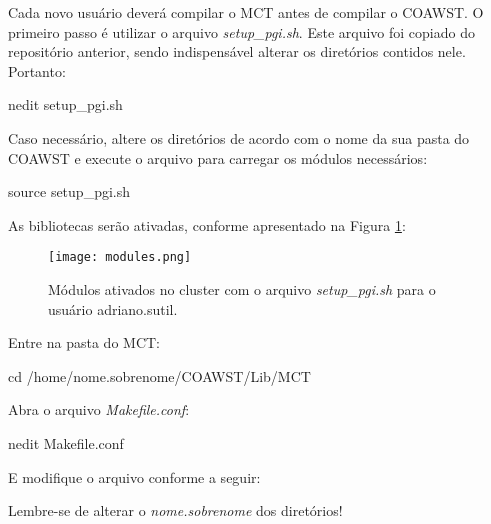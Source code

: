 \noindent Cada novo usuário deverá compilar o MCT antes de compilar o COAWST. O primeiro passo é utilizar o arquivo \textit{setup\_pgi.sh}. Este arquivo foi copiado do repositório anterior, sendo indispensável alterar os diretórios contidos nele.
Portanto:
\bigskip

\begin{bashcode}
nedit setup_pgi.sh
\end{bashcode}
\bigskip

\noindent Caso necessário, altere os diretórios de acordo com o nome da sua pasta do COAWST e execute o arquivo para carregar os módulos necessários:
\bigskip

\begin{bashcode}
source setup_pgi.sh
\end{bashcode}
\bigskip

\noindent As bibliotecas serão ativadas, conforme apresentado na Figura \textcolor{bleu_cite}{\ref{modulos}}:
\bigskip


\begin{figure}[H]
    \centering
    \texttt{[image: modules.png]}
    \caption{Módulos ativados no cluster com o arquivo \textit{setup\_pgi.sh} para o usuário adriano.sutil.}
    \label{modulos}
\end{figure}
\bigskip


\noindent Entre na pasta do MCT:
\bigskip

\begin{bashcode}
cd /home/nome.sobrenome/COAWST/Lib/MCT
\end{bashcode}
\bigskip

\noindent Abra o arquivo \textit{Makefile.conf}:
\bigskip


\begin{bashcode}
nedit Makefile.conf
\end{bashcode}
\bigskip

\noindent E modifique o arquivo conforme a seguir:
\bigskip

\begin{tcolorbox}[enhanced,
  grow to left by=0cm,%
  grow to right by=0cm,%
  enlarge top by=0cm,%
  enlarge bottom by=0cm,%
  tcbox raise base,
  boxrule=1.0pt,
  left=18mm,
  colframe=red!50!black,coltext=red!25!black,colback=red!10!white,
  overlay={\begin{tcbclipinterior}\fill[red!75!blue!50!white] (frame.south west)
    rectangle node[text=white,font=\sffamily\bfseries\footnotesize,rotate=0] {ATENÇÃO} ([xshift=18mm]frame.north west);\end{tcbclipinterior}}]
Lembre-se de alterar o \textit{nome.sobrenome} dos diretórios!
\end{tcolorbox}
\bigskip

